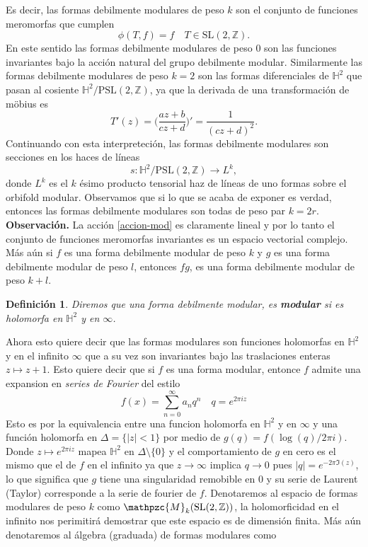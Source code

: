 \documentclass[letterpaper]{article}
\newtheorem{def.}{Definici\'on}[section]
\newcommand{\obs}{{\newline \noindent \sc \textbf{Observación. }}}
\newcommand{\slz}{\ensuremath{\mathrm{SL}(2,\mathbb Z) }}
\newcommand{\pslz}{\ensuremath{\mathrm{PSL}(2,\mathbb Z) }}
\newcommand{\hd}{\ensuremath{\mathbb H^2}}
\newcommand{\mdlr}{\ensuremath{\mathpzc{M}}}
\begin{document}
Es decir, las formas debilmente modulares de peso \(k\) son el conjunto de funciones meromorfas que cumplen
\[
    \phi(T,f)=f\quad T\in\slz.
\]
En este sentido las formas debilmente modulares de peso \(0\) son las funciones invariantes bajo la acción natural del grupo debilmente modular. Similarmente las formas debilmente modulares de peso \(k=2\) son las formas diferenciales de \(\hd\) que pasan al cosiente \(\hd/\pslz\), ya que la derivada de una transformación de möbius es
\[
    T'(z)=\Big(\frac{az+b}{cz+d}\Big)'=\frac{1}{(cz+d)^2}.
\]
Continuando con esta interpreteción, las formas debilmente modulares son secciones en los haces de líneas
\[
    s:\hd/\pslz\rightarrow L^{k},
\]
donde \(L^k\) es el \(k\) ésimo producto tensorial haz de líneas de uno formas sobre el orbifold modular. Observamos que si lo que se acaba de exponer es verdad, entonces las formas debilmente modulares son todas de peso par \(k=2r\).
\obs La acción \ref{accion-mod} es claramente lineal y por lo tanto el conjunto de funciones meromorfas invariantes es un espacio vectorial complejo. Más aún si \(f\) es una forma debilmente modular de peso \(k\) y \(g\) es una forma debilmente modular de peso \(l\), entonces \(fg\), es una forma debilmente modular de peso \(k+l\).
\begin{def.}
Diremos que una forma debilmente modular, es \textbf{modular} si es holomorfa en \(\hd\) y en \(\infty\).
\end{def.}
Ahora esto quiere decir que las formas modulares son funciones holomorfas en \(\hd\) y en el infinito \(\infty\) que a su vez son invariantes bajo las traslaciones enteras \(z\mapsto z+1\). Esto quiere decir que si \(f\) es una forma modular, entonce \(f\) admite una expansion en \emph{series de Fourier} del estilo
\[
    f(x)=\sum^{\infty}_{n=0}a_nq^{n}\quad q=e^{2\pi iz}
\]
Esto es por la equivalencia entre una funcion holomorfa en \(\hd\) y en \(\infty\) y una función holomorfa en \(\Delta=\{|z|< 1\}\) por medio de \(g(q)=f(\log(q)/2\pi i)\). Donde \(z\mapsto e^{2\pi i z}\) mapea \(\hd\) en \(\Delta\setminus\{0\}\) y el comportamiento de \(g\) en cero es el mismo que el de \(f\) en el infinito ya que \(z\rightarrow\infty\) implica \(q\rightarrow 0\) pues \(|q|=e^{-2\pi\Im(z)}\), lo que significa que \(g\) tiene una singularidad remobible en \(0\) y su serie de Laurent (Taylor) corresponde a la serie de fourier de \(f\).
Denotaremos al espacio de formas modulares de peso \(k\) como \(\mdlr_{k}(\slz)\), la holomorficidad en el infinito nos perimitirá demostrar que este espacio es de dimensión finita. Más aún denotaremos al álgebra (graduada) de formas modulares como
\end{document}
